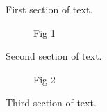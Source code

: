 \documentclass{article}
\begin{document}
First section of text.

\begin{figure}
\caption{Fig 1}
\end{figure}

Second section of text.

\begin{figure}[h]
\caption{Fig 2}
\end{figure}

Third section of text.
\end{document}
